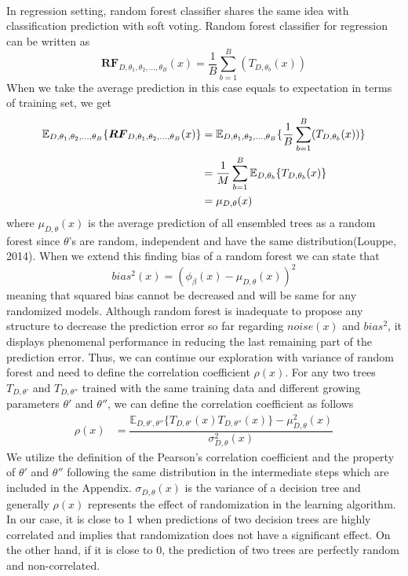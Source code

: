 \paragraph{}
In regression setting, random forest classifier shares the same idea with classification prediction with soft voting. Random forest classifier for regression can be written as
\begin{equation}
\boldsymbol{RF}_{D, \theta_{1},\theta_{2},..., \theta_{B}}(x) = \dfrac{1}{B}\sum_{b = 1}^{B}(T_{D,\theta_{b}}(x))
\end{equation}
When we take the average prediction in this case equals to expectation in terms of training set, we get
\begin{align}
\mathbb{E}_{D, \theta_{1}, \theta_{2},..., \theta_{B}}\{\boldsymbol{RF}_{D, \theta_{1},\theta_{2},..., \theta_{B}}(x) \} & = 
	\mathbb{E}_{D, \theta_{1}, \theta_{2},..., \theta_{B}}\{\dfrac{1}{B}\sum_{b = 1}^{B}(T_{D,\theta_{b}}(x))\} \notag \\
	& = \dfrac{1}{M}\sum_{b=1}^{B}\mathbb{E}_{D,\theta_{b}}\{T_{D, \theta_{b}}(x)\}\notag \\
	& = \mu_{D,\theta}(x)
\end{align}
where $\mu_{D,\theta}(x)$ is the average prediction of all ensembled trees as a random forest since $\theta$'s are random, independent
and have the same distribution(Louppe, 2014). When we extend this finding bias of a random forest we can state that 
\begin{equation}
bias^2(x) = (\phi_{\beta}(x) - \mu_{D,\theta}(x))^2
\end{equation}
meaning that squared bias cannot be decreased and will be same for any randomized models. Although random forest is inadequate to propose any structure to decrease the prediction error so far regarding $noise(x)$ and $bias^2$, it displays phenomenal performance in reducing the last remaining part of the prediction error. Thus, we can continue our exploration with variance of random forest and need to define the correlation coefficient $\rho(x)$. For any two trees $T_{D,\theta'}$ and $T_{D,\theta''}$ trained with the same training data and different growing parameters $\theta'$ and $\theta''$, we can define the correlation coefficient as follows
\begin{align}
\rho(x) & = \dfrac{\mathbb{E}_{D,\theta',\theta''}\{T_{D,\theta'}(x) T_{D,\theta''}(x)\} - \mu_{D,\theta}^2(x)}{\sigma_{D,\theta}^2(x)}
\end{align}
We utilize the definition of the Pearson's correlation coefficient and the property of $\theta'$ and $\theta''$ following the same distribution in the intermediate steps which are included in the Appendix. $\sigma_{D, \theta}(x)$ is the variance of a decision tree and generally $\rho(x)$ represents the effect of randomization in the learning algorithm. In our case, it is close to 1 when predictions of two decision trees are highly correlated and implies that randomization does not have a significant effect. On the other hand, if it is close to 0, the prediction of two trees are perfectly random and non-correlated.

